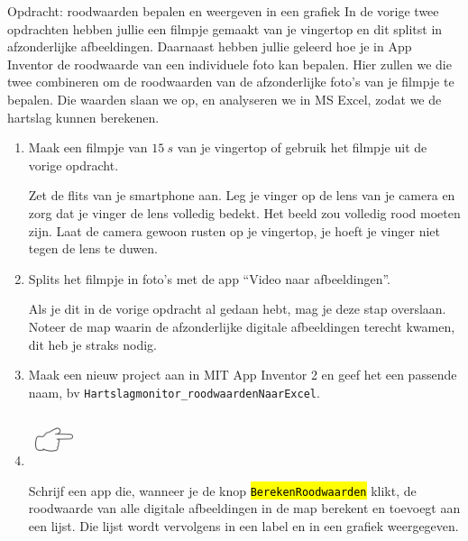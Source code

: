 \begin{opdracht}{Opdracht: roodwaarden bepalen en weergeven in een grafiek}
In de vorige twee opdrachten hebben jullie een filmpje gemaakt van je vingertop en dit splitst in afzonderlijke afbeeldingen. Daarnaast hebben jullie geleerd hoe je in App Inventor de roodwaarde van een individuele foto kan bepalen. Hier zullen we die twee combineren om de roodwaarden van de afzonderlijke foto's van je filmpje te bepalen. Die waarden slaan we op, en analyseren we in MS Excel, zodat we de hartslag kunnen berekenen.

\begin{enumerate}
	
	\item Maak een filmpje van $15~s$ van je vingertop of gebruik het filmpje uit de vorige opdracht.
	
	Zet de flits van je smartphone aan. Leg je vinger op de lens van je camera en zorg dat je vinger de lens volledig bedekt. Het beeld zou volledig rood moeten zijn. Laat de camera gewoon rusten op je vingertop, je hoeft je vinger niet tegen de lens te duwen.
	
	\item Splits het filmpje in foto's met de app \textquotedblleft Video naar afbeeldingen\textquotedblright.
	
	Als je dit in de vorige opdracht al gedaan hebt, mag je deze stap overslaan. Noteer de map waarin de afzonderlijke digitale afbeeldingen terecht kwamen, dit heb je straks nodig.
	
	\item Maak een nieuw project aan in MIT App Inventor 2 en geef het een passende naam, bv \texttt{Hartslagmonitor\_roodwaardenNaarExcel}. 
	
	\item \begin{minipage}{.1\linewidth}
		\includegraphics[width=1.5cm]{inputs/opdracht}
		\vspace{2.5cm}
	\end{minipage}
	\begin{minipage}{.5\linewidth}
		Schrijf een app die, wanneer je de knop \hl{\texttt{BerekenRoodwaarden}} klikt, de roodwaarde van alle digitale afbeeldingen in de map berekent en toevoegt aan een lijst. Die lijst wordt vervolgens in een label en in een grafiek weergegeven.
	\end{minipage}
	\begin{minipage}{.3\linewidth}
	\end{minipage}
	

\end{enumerate}
\end{opdracht}
